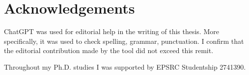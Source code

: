 \chapter{Acknowledgements}\label{chap:acknowledgements}

ChatGPT was used for editorial help in the writing of this thesis.
More specifically, it was used to check spelling, grammar, punctuation.
I confirm that the editorial contribution made by the tool did not exceed this remit.

Throughout my Ph.D. studies I was supported by EPSRC Studentship 2741390.


